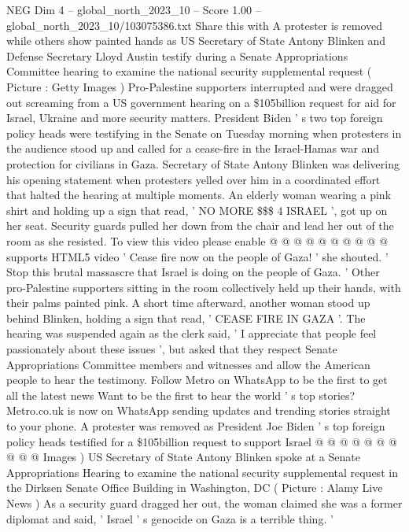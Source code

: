 \begin{textsample}{NEG Dim 4 – global\_north\_2023\_10 – Score 1.00 – global\_north\_2023\_10/103075386.txt}  \label{ex:f4_neg_013}
Share this with A protester is removed while others show painted hands as US Secretary of State Antony Blinken and Defense Secretary Lloyd Austin testify during a Senate Appropriations Committee hearing to examine the national security supplemental request ( Picture : Getty Images ) Pro-Palestine supporters interrupted and were dragged out screaming from a US government hearing on a \$105billion request for aid for Israel, Ukraine and more security matters.
President Biden ' s two top foreign policy heads were testifying in the Senate on Tuesday morning when protesters in the audience stood up and called for a cease-fire in the Israel-Hamas war and protection for civilians in Gaza.
Secretary of State Antony Blinken was delivering his opening statement when protesters yelled over him in a coordinated effort that halted the hearing at multiple moments.
An elderly woman wearing a pink shirt and holding up a sign that read, ' NO MORE \$\$\$ 4 ISRAEL ', got up on her seat.
Security guards pulled her down from the chair and lead her out of the room as she resisted.
To view this video please enable @ @ @ @ @ @ @ @ @ @ supports HTML5 video ' Cease fire now on the people of Gaza! ' she shouted. ' Stop this brutal massascre that Israel is doing on the people of Gaza. ' Other pro-Palestine supporters sitting in the room collectively held up their hands, with their palms painted pink.
A short time afterward, another woman stood up behind Blinken, holding a sign that read, ' CEASE FIRE IN GAZA '.
The hearing was suspended again as the clerk said, ' I appreciate that people feel passionately about these issues ', but asked that they respect Senate Appropriations Committee members and witnesses and allow the American people to hear the testimony.
Follow Metro on WhatsApp to be the first to get all the latest news Want to be the first to hear the world ' s top stories?
Metro.co.uk is now on WhatsApp sending updates and trending stories straight to your phone.
A protester was removed as President Joe Biden ' s top foreign policy heads testified for a \$105billion request to support Israel @ @ @ @ @ @ @ @ @ @ Images ) US Secretary of State Antony Blinken spoke at a Senate Appropriations Hearing to examine the national security supplemental request in the Dirksen Senate Office Building in Washington, DC ( Picture : Alamy Live News ) As a security guard dragged her out, the woman claimed she was a former diplomat and said, ' Israel ' s genocide on Gaza is a terrible thing. '

\end{textsample}
